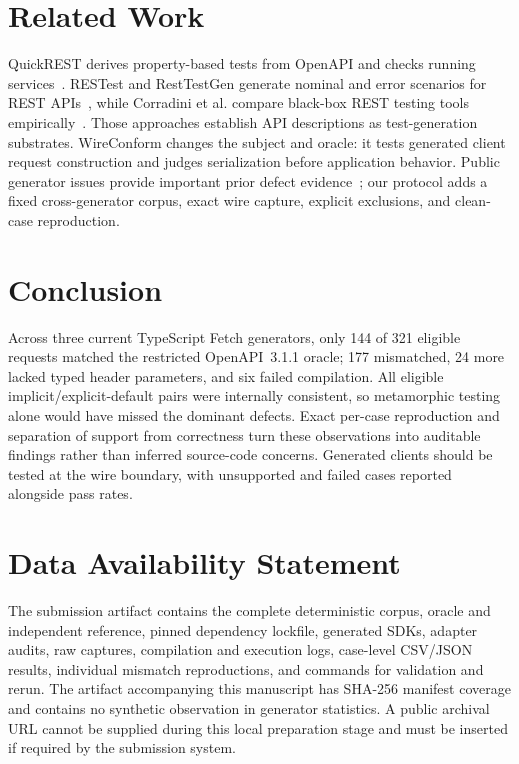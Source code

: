 \documentclass[runningheads]{llncs}
\begin{document}
\section{Related Work}

QuickREST derives property-based tests from OpenAPI and checks running services~\cite{quickrest}. RESTest and RestTestGen generate nominal and error scenarios for REST APIs~\cite{restest,resttestgen}, while Corradini et al. compare black-box REST testing tools empirically~\cite{corradini}. Those approaches establish API descriptions as test-generation substrates. WireConform changes the subject and oracle: it tests generated client request construction and judges serialization before application behavior. Public generator issues provide important prior defect evidence~\cite{heyissue,orvalissue,genissue}; our protocol adds a fixed cross-generator corpus, exact wire capture, explicit exclusions, and clean-case reproduction.

\section{Conclusion}

Across three current TypeScript Fetch generators, only 144 of 321 eligible requests matched the restricted OpenAPI~3.1.1 oracle; 177 mismatched, 24 more lacked typed header parameters, and six failed compilation. All eligible implicit/explicit-default pairs were internally consistent, so metamorphic testing alone would have missed the dominant defects. Exact per-case reproduction and separation of support from correctness turn these observations into auditable findings rather than inferred source-code concerns. Generated clients should be tested at the wire boundary, with unsupported and failed cases reported alongside pass rates.

\section*{Data Availability Statement}
The submission artifact contains the complete deterministic corpus, oracle and independent reference, pinned dependency lockfile, generated SDKs, adapter audits, raw captures, compilation and execution logs, case-level CSV/JSON results, individual mismatch reproductions, and commands for validation and rerun. The artifact accompanying this manuscript has SHA-256 manifest coverage and contains no synthetic observation in generator statistics. A public archival URL cannot be supplied during this local preparation stage and must be inserted if required by the submission system.
\end{document}
